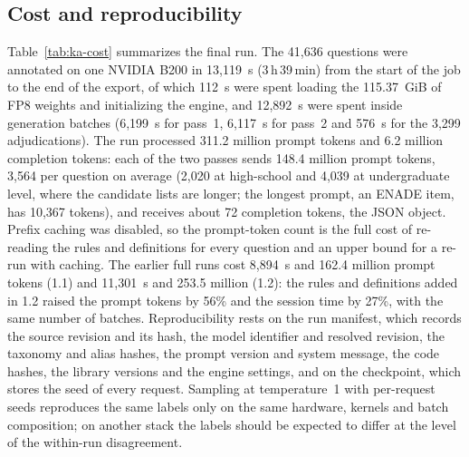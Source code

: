 \subsection{Cost and reproducibility}
\label{app:ka-cost}

Table~\ref{tab:ka-cost} summarizes the final run. The 41,636 questions were
annotated on one NVIDIA B200 in 13,119~s (3\,h\,39\,min) from the start of
the job to the end of the export, of which 112~s were spent loading the
115.37~GiB of FP8 weights and initializing the engine, and 12,892~s were
spent inside generation batches (6,199~s for pass~1, 6,117~s for pass~2 and
576~s for the 3,299 adjudications). The run processed 311.2 million prompt
tokens and 6.2 million completion tokens: each of the two passes sends
148.4 million prompt tokens, 3,564 per question on average (2,020 at
high-school and 4,039 at undergraduate level, where the candidate lists are
longer; the longest prompt, an ENADE item, has 10,367 tokens), and receives about 72 completion tokens, the JSON object. Prefix
caching was disabled, so the prompt-token count is the full cost of
re-reading the rules and definitions for every question and an upper bound
for a re-run with caching. The earlier full runs cost 8,894~s and 162.4
million prompt tokens (1.1) and 11,301~s and 253.5 million (1.2): the
rules and definitions added in 1.2 raised the prompt tokens by 56\% and the
session time by 27\%, with the same number of batches. Reproducibility rests
on the run manifest, which records the source revision and its hash, the
model identifier and resolved revision, the taxonomy and alias hashes, the
prompt version and system message, the code hashes, the library versions and
the engine settings, and on the checkpoint, which stores the seed of every
request. Sampling at temperature~1 with per-request seeds reproduces the same
labels only on the same hardware, kernels and batch composition; on another
stack the labels should be expected to differ at the level of the within-run
disagreement.

